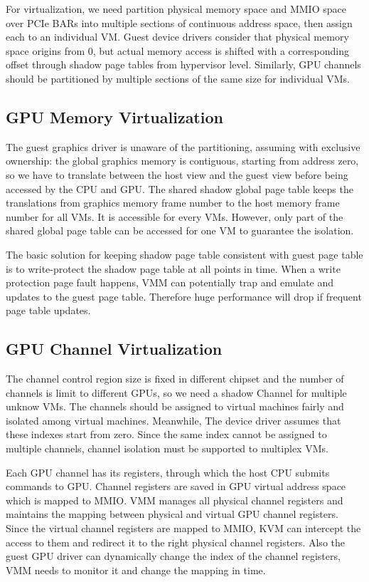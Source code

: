 \documentclass[a4paper,12pt]{article}
\begin{document}
For virtualization, we need partition physical memory space and MMIO space over PCIe BARs into multiple sections of continuous address space, then assign each to an individual VM. Guest device drivers consider that physical memory space origins from 0, but actual memory access is shifted with a corresponding offset through shadow page tables from hypervisor level. Similarly, GPU channels should be partitioned by multiple sections of the same size for individual VMs\cite{183931}.

\subsection{GPU Memory Virtualization}

The guest graphics driver is unaware of the partitioning, assuming with exclusive ownership: the global graphics memory is contiguous, starting from address zero, so we have to translate between the host view and the guest view before being accessed by the CPU and GPU. The shared shadow global page table keeps the translations from graphics memory frame number to the host memory frame number for all VMs. It is accessible for every VMs. However, only part of the shared global page table can be accessed for one VM to guarantee the isolation.\cite{191581}

The basic solution for keeping shadow page table consistent with guest page table is to write-protect the
shadow page table at all points in time. When a write protection page fault happens, VMM can potentially
trap and emulate and  updates to the guest page table. Therefore huge performance will drop if frequent page table updates. 

\subsection{ GPU Channel Virtualization}

The channel control region size is fixed in different chipset and the number of channels is limit
to different GPUs, so we need a shadow Channel for multiple unknow VMs. The channels should be assigned to virtual machines fairly and isolated among virtual machines. Meanwhile, The device driver assumes that these indexes start from zero. Since the same index cannot be assigned to multiple channels, channel isolation must be supported to multiplex VMs\cite{184002}.

Each GPU channel has its registers, through which the host CPU submits commands to GPU. Channel
registers are saved in GPU virtual address space which is mapped to MMIO. VMM manages all physical channel registers and maintains the mapping between physical and virtual GPU channel registers. Since the virtual channel registers are mapped to MMIO, KVM can intercept the access to them and redirect it to the right physical channel registers. Also the guest GPU driver can dynamically change the index of the channel registers, VMM needs to monitor it and change the mapping in time.
\end{document}

